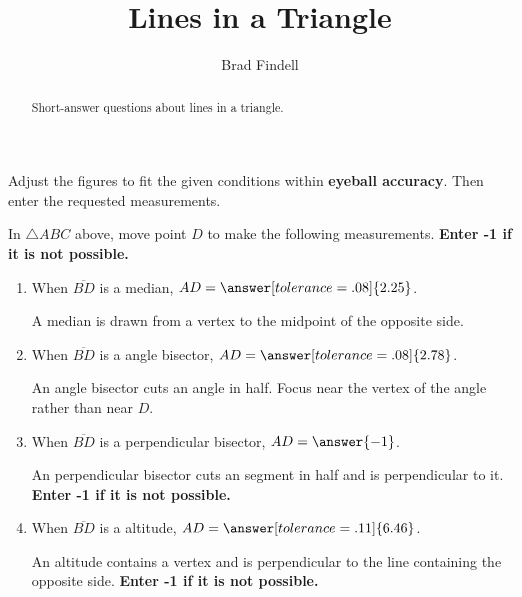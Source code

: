 \documentclass[nooutcomes]{ximera}
\title{Lines in a Triangle}
\author{Brad Findell}
\begin{document}
\begin{abstract}
Short-answer questions about lines in a triangle. 
\end{abstract}
\maketitle

Adjust the figures to fit the given conditions within \textbf{eyeball accuracy}.  Then enter the requested measurements.  


\begin{problem}
\begin{center}  
\end{center}
In $\triangle ABC$ above, move point $D$ to make the following measurements.  \textbf{Enter -1 if it is not possible.}   
\begin{enumerate}
\item When $\overline{BD}$ is a median, $AD=\answer[tolerance=.08]{2.25}$.
\begin{hint}
A median is drawn from a vertex to the midpoint of the opposite side.
\end{hint}
\item When $\overline{BD}$ is a angle bisector, $AD=\answer[tolerance=.08]{2.78}$.
\begin{hint}
An angle bisector cuts an angle in half.  Focus near the vertex of the angle rather than near $D$.
\end{hint}
\item When $\overline{BD}$ is a perpendicular bisector, $AD=\answer{-1}$.
\begin{hint}
An perpendicular bisector cuts an segment in half and is perpendicular to it. \textbf{Enter -1 if it is not possible.} 
\end{hint}
\item When $\overline{BD}$ is a altitude, $AD=\answer[tolerance=.11]{6.46}$.
\begin{hint}
An altitude contains a vertex and is perpendicular to the line containing the opposite side. \textbf{Enter -1 if it is not possible.} 
\end{hint}
\end{enumerate}
\end{problem}
\end{document}
